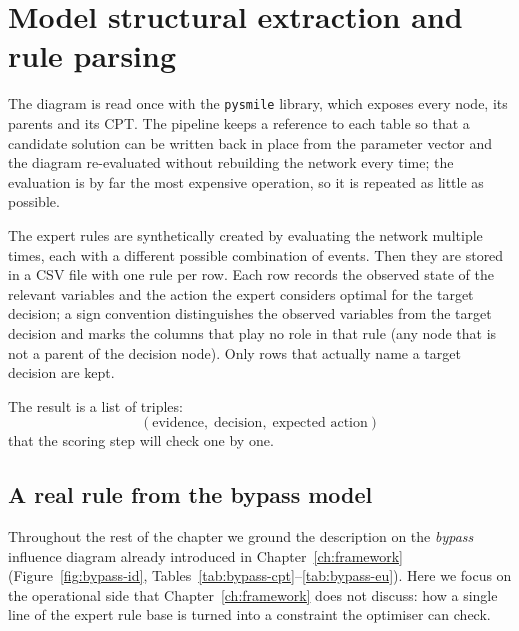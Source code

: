 \section{Model structural extraction and rule parsing}

The diagram is read once with the \texttt{pysmile} library, which exposes every
node, its parents and its CPT. The pipeline keeps a reference to each table so that a candidate solution can be written back
in place from the parameter vector and the diagram re-evaluated without rebuilding the network every time; the evaluation is by far the most expensive operation, so it
is repeated as little as possible.

The expert rules are synthetically created by evaluating the network multiple times, each with a different possible combination of events. Then they are stored in a CSV file with one rule per row. Each row
records the observed state of the relevant variables and the action the
expert considers optimal for the target decision; a sign convention
distinguishes the observed variables from the target decision and marks
the columns that play no role in that rule (any node that is not a parent of the decision node). Only rows that actually name
a target decision are kept. 

The result is a list of triples:
\[
  (\text{evidence},\; \text{decision},\; \text{expected action})
\]
that the scoring step will check one by one.

\subsection{A real rule from the bypass model}
\label{sec:bypass-example}

Throughout the rest of the chapter we ground the description on the
\emph{bypass} influence diagram already introduced in
Chapter~\ref{ch:framework} (Figure~\ref{fig:bypass-id},
Tables~\ref{tab:bypass-cpt}--\ref{tab:bypass-eu}). Here we focus on
the operational side that Chapter~\ref{ch:framework} does not
discuss: how a single line of the expert rule base is turned into a
constraint the optimiser can check.

